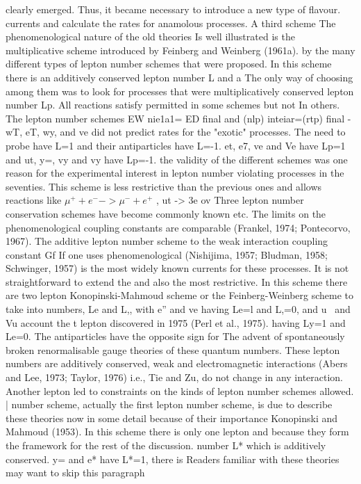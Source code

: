 \documentclass[twoside]{article}
\begin{document}
clearly emerged. Thus, it became necessary to introduce a new type of flavour. currents and calculate the rates for anamolous processes. A third scheme
The phenomenological nature of the old theories Is well illustrated is the multiplicative scheme introduced by Feinberg and Weinberg (1961a).
by the many different types of lepton number schemes that were proposed. In this scheme there is an additively conserved lepton number L and a
The only way of choosing among them was to look for processes that were multiplicatively conserved lepton number Lp. All reactions satisfy
permitted in some schemes but not In others. The lepton number schemes EW nie1a1= ED final and (nlp) inteiar=(rtp) final - wT, eT, wy, and ve
did not predict rates for the "exotic" processes. The need to probe
have L=1 and their antiparticles have L=-1. et, e7, ve and Ve have Lp=1 and ut, y=, vy and vy have Lp=-1.
the validity of the different schemes was one reason for the experimental interest in lepton number violating processes in the seventies.  This scheme is less restrictive than
 the previous ones and allows reactions like $\mu^{+}+e^{-} -> \mu^{-}+e^{+}$ , ut -> 3e ov
Three lepton number conservation schemes have become commonly known etc. The limits on the phenomenological coupling constants are comparable
(Frankel, 1974; Pontecorvo, 1967). The additive lepton number scheme to the weak interaction coupling constant Gf If one uses phenomenological
(Nishijima, 1957; Bludman, 1958; Schwinger, 1957) is the most widely known currents for these processes. It is not straightforward to extend the
and also the most restrictive. In this scheme there are two lepton Konopinski-Mahmoud scheme or the Feinberg-Weinberg scheme to take into
numbers, Le and L,, with e” and ve having Le=l and L,=0, and u~ and Vu account the t lepton discovered in 1975 (Perl et al., 1975).
having Ly=1 and Le=0. The antiparticles have the opposite sign for The advent of spontaneously broken renormalisable gauge theories of
these quantum numbers. These lepton numbers are additively conserved, weak and electromagnetic interactions (Abers and Lee, 1973; Taylor, 1976)
i.e., Tie and Zu, do not change in any interaction. Another lepton led to constraints on the kinds of lepton number schemes allowed. |
number scheme, actually the first lepton number scheme, is due to describe these theories now in some detail because of their importance
Konopinski and Mahmoud (1953). In this scheme there is only one lepton and because they form the framework for the rest of the discussion.
number L* which is additively conserved. y= and e* have L*=1, there is Readers familiar with these theories may want to skip this paragraph
\end{document}
